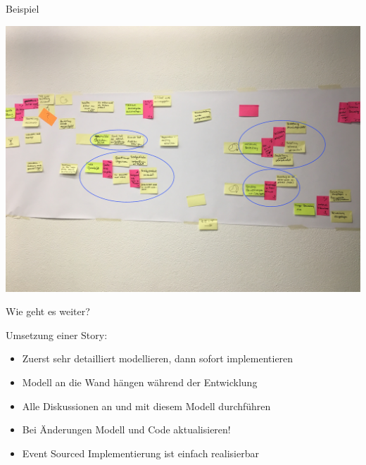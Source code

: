 \begin{frame}[fragile]{Beispiel}

\begin{center}
\includegraphics[width=.85\textwidth]{pics/eventstorming_stories.jpg}
\end{center}

\end{frame}



\begin{frame}[fragile]{Wie geht es weiter?}

Umsetzung einer Story:

\begin{itemize}
\item Zuerst sehr detailliert modellieren, dann sofort implementieren
\item Modell an die Wand hängen während der Entwicklung
\item Alle Diskussionen an und mit diesem Modell durchführen
\item Bei Änderungen Modell und Code aktualisieren!
\item Event Sourced Implementierung ist einfach realisierbar
\end{itemize}

\end{frame}

